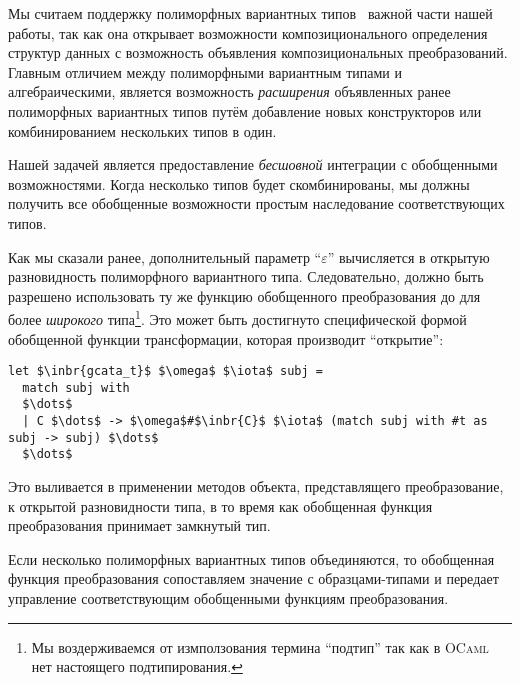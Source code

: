 Мы считаем поддержку полиморфных вариантных типов~\cite{PolyVar,PolyVarReuse} важной части нашей работы, так как она открывает возможности 
композиционального определения структур данных с возможность объявления композициональных преобразований.
Главным отличием между полиморфными вариантным типами  и алгебраическими, является возможность 
\emph{расширения} объявленных ранее полиморфных вариантных типов путём добавление новых конструкторов или комбинированием нескольких типов в один. 

Нашей задачей является предоставление  \emph{бесшовной} интеграции с обобщенными возможностями. Когда несколько типов будет скомбинированы, мы должны получить все обобщенные возможности простым наследование соответствующих типов.

Как мы сказали ранее, дополнительный параметр  ``$\varepsilon$'' вычисляется в открытую разновидность полиморфного вариантного типа. Следовательно, должно быть разрешено использовать ту же функцию обобщенного преобразования до для более \emph{широкого} типа\footnote{Мы воздерживаемся от измползования термина ``подтип'' так как в \textsc{OCaml} нет настоящего подтипирования.}. 
Это может быть достигнуто специфической формой обобщенной функции трансформации, которая производит ``открытие'':

\begin{lstlisting}
let $\inbr{gcata_t}$ $\omega$ $\iota$ subj =
  match subj with
  $\dots$
  | C $\dots$ -> $\omega$#$\inbr{C}$ $\iota$ (match subj with #t as subj -> subj) $\dots$
  $\dots$
\end{lstlisting}

Это выливается в применении методов объекта, представлящего преобразование, к открытой разновидности типа, в то время как обобщенная функция преобразования принимает замкнутый тип.

Если несколько полиморфных вариантных типов объединяются, то обобщенная функция преобразования сопоставляем значение с образцами-типами и передает управление соответствующим обобщенными функциям преобразования.

